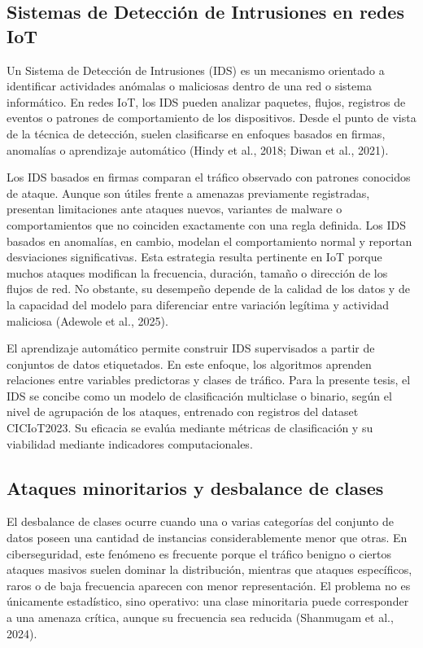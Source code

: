 \documentclass[12pt,a4paper]{article}
\begin{document}
\subsection{Sistemas de Detección de Intrusiones en redes IoT}

Un Sistema de Detección de Intrusiones (IDS) es un mecanismo orientado a identificar actividades anómalas o maliciosas dentro de una red o sistema informático. En redes IoT, los IDS pueden analizar paquetes, flujos, registros de eventos o patrones de comportamiento de los dispositivos. Desde el punto de vista de la técnica de detección, suelen clasificarse en enfoques basados en firmas, anomalías o aprendizaje automático (Hindy et al., 2018; Diwan et al., 2021).

Los IDS basados en firmas comparan el tráfico observado con patrones conocidos de ataque. Aunque son útiles frente a amenazas previamente registradas, presentan limitaciones ante ataques nuevos, variantes de malware o comportamientos que no coinciden exactamente con una regla definida. Los IDS basados en anomalías, en cambio, modelan el comportamiento normal y reportan desviaciones significativas. Esta estrategia resulta pertinente en IoT porque muchos ataques modifican la frecuencia, duración, tamaño o dirección de los flujos de red. No obstante, su desempeño depende de la calidad de los datos y de la capacidad del modelo para diferenciar entre variación legítima y actividad maliciosa (Adewole et al., 2025).

El aprendizaje automático permite construir IDS supervisados a partir de conjuntos de datos etiquetados. En este enfoque, los algoritmos aprenden relaciones entre variables predictoras y clases de tráfico. Para la presente tesis, el IDS se concibe como un modelo de clasificación multiclase o binario, según el nivel de agrupación de los ataques, entrenado con registros del dataset CICIoT2023. Su eficacia se evalúa mediante métricas de clasificación y su viabilidad mediante indicadores computacionales.

\subsection{Ataques minoritarios y desbalance de clases}

El desbalance de clases ocurre cuando una o varias categorías del conjunto de datos poseen una cantidad de instancias considerablemente menor que otras. En ciberseguridad, este fenómeno es frecuente porque el tráfico benigno o ciertos ataques masivos suelen dominar la distribución, mientras que ataques específicos, raros o de baja frecuencia aparecen con menor representación. El problema no es únicamente estadístico, sino operativo: una clase minoritaria puede corresponder a una amenaza crítica, aunque su frecuencia sea reducida (Shanmugam et al., 2024).
\end{document}
